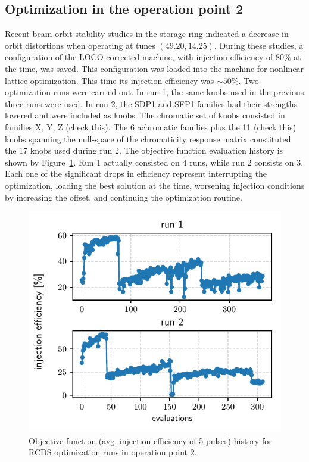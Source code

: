 \documentclass[a4paper,
               keeplastbox,   %
               ]{jacow}
\begin{document}
\subsection{Optimization in the operation point 2}
 Recent beam orbit stability studies in the storage ring indicated a decrease in orbit distortions when operating at tunes $(49.20, 14.25)$. During these studies, a configuration of the LOCO-corrected machine, with injection efficiency of $80\%$ at the time, was saved. This configuration was loaded into the machine for nonlinear lattice optimization. This time its injection efficiency was $\sim50\%$. Two optimization runs were carried out. In run 1, the same knobs used in the previous three runs were used. In run 2, the SDP1 and SFP1 families had their strengths lowered and were included as knobs. The chromatic set of knobs consisted in families X, Y, Z (check this). The 6 achromatic families plus the 11 (check this) knobs spanning the null-space of the chromaticity response matrix constituted the 17 knobs used during run 2.
 The objective function evaluation history is shown by Figure~\ref{fig:newtunes_runs12}. Run 1 actually consisted on 4 runs, while run 2 consists on 3. Each one of the significant drops in efficiency represent interrupting the optimization, loading the best solution at the time, worsening injection conditions by increasing the offset, and continuing the optimization routine.
\begin{figure}[!h]
   \includegraphics[width=\columnwidth]{newtunes_runs12.pdf}
   \caption{Objective function (avg. injection efficiency of 5 pulses) history for RCDS optimization runs in operation point 2.}
   \label{fig:newtunes_runs12}
\end{figure}
\end{document}
